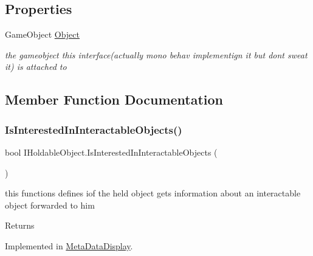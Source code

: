 \subsection*{Properties}
\begin{DoxyCompactItemize}
\item 
Game\+Object \mbox{\hyperlink{interface_i_holdable_object_a99b6760e4f5c71c79d8b084673a3818b}{Object}}
\begin{DoxyCompactList}\small\item\em the gameobject this interface(actually mono behav implementign it but don\textquotesingle{}t sweat it) is attached to \end{DoxyCompactList}\end{DoxyCompactItemize}


\subsection{Member Function Documentation}
\mbox{\label{interface_i_holdable_object_a0356d534c17ab4e04fba00b42abeea77}} 
\subsubsection{\texorpdfstring{Is\+Interested\+In\+Interactable\+Objects()}{IsInterestedInInteractableObjects()}}
{\footnotesize\ttfamily bool I\+Holdable\+Object.\+Is\+Interested\+In\+Interactable\+Objects (\begin{DoxyParamCaption}{ }\end{DoxyParamCaption})}





this functions defines iof the held object gets information about an interactable object forwarded to him 

\begin{DoxyReturn}{Returns}

\end{DoxyReturn}


Implemented in \mbox{\hyperlink{class_meta_data_display_a6aa943864ef85667977a13c895c2ce23}{Meta\+Data\+Display}}.

